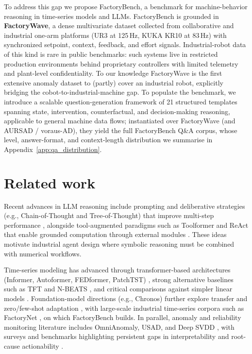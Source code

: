 \documentclass{article}
\begin{document}
To address this gap we propose FactoryBench, a benchmark for machine-behavior reasoning in time-series models and LLMs. FactoryBench is grounded in \textbf{FactoryWave}, a dense multivariate dataset collected from collaborative and industrial one-arm platforms (UR3 at 125\,Hz, KUKA KR10 at 83\,Hz) with synchronized setpoint, context, feedback, and effort signals. Industrial-robot data of this kind is rare in public benchmarks: such systems live in restricted production environments behind proprietary controllers with limited telemetry and plant-level confidentiality. To our knowledge FactoryWave is the first extensive anomaly dataset to (partly) cover an industrial robot, explicitly bridging the cobot-to-industrial-machine gap. To populate the benchmark, we introduce a scalable question-generation framework of 21 structured templates spanning state, intervention, counterfactual, and decision-making reasoning, applicable to general machine data flows; instantiated over FactoryWave (and AURSAD / voraus-AD), they yield the full FactoryBench Q\&A corpus, whose level, answer-format, and context-length distribution we summarise in Appendix~\ref{app:qa_distribution}.

\section{Related work}

Recent advances in LLM reasoning include prompting and deliberative strategies (e.g., Chain-of-Thought and Tree-of-Thought) that improve multi-step performance \cite{wei2022chain,yao2023tree}, alongside tool-augmented paradigms such as Toolformer and ReAct that enable grounded computation through external modules \cite{schick2023toolformer,yao2023react,qin2023tool}. These ideas motivate industrial agent design where symbolic reasoning must be combined with numerical workflows.

Time-series modeling has advanced through transformer-based architectures (Informer, Autoformer, FEDformer, PatchTST) \cite{zhou2021informer,wu2021autoformer,zhou2022fedformer,nie2022time}, strong alternative baselines such as TFT and N-BEATS \cite{lim2021tft,oreshkin2020nbeats}, and critical comparisons against simpler linear models \cite{zeng2023transformers}. Foundation-model directions (e.g., Chronos) further explore transfer and zero/few-shot adaptation \cite{ansari2024chronos,das2024decoder}, with large-scale industrial time-series corpora such as FactoryNet \cite{othman2026factorynetlargescaledatasetindustrial}, on which FactoryBench builds. In parallel, anomaly and reliability monitoring literature includes OmniAnomaly, USAD, and Deep SVDD \cite{su2019omni,audibert2020usad,ruff2018deep}, with surveys and benchmarks highlighting persistent gaps in interpretability and root-cause actionability \cite{chalapathy2019survey,lavin2015numenta}.
\end{document}
